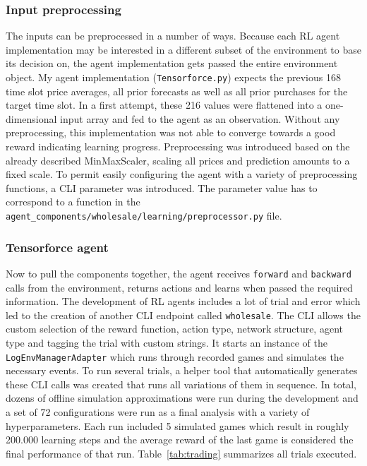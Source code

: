\subsubsection{Input preprocessing}%
\label{sub:input_preprocessing}

The inputs can be preprocessed in a number of ways. Because each \ac{RL} agent implementation may be interested in a
different subset of the environment to base its decision on, the agent implementation gets passed the entire environment
object.
My agent implementation (\texttt{Tensorforce.py})
expects the previous 168 time slot price averages, all prior forecasts as well as all prior purchases for the
target time slot. In a first attempt, these 216 values were flattened into a one-dimensional input array and fed
to the agent as an observation. Without any preprocessing, this implementation was not able to converge towards a good
reward indicating learning progress. Preprocessing was introduced based on the already described MinMaxScaler,
scaling all prices and prediction amounts to a fixed scale. To permit easily configuring the agent with a variety of
preprocessing functions, a CLI parameter was introduced. The parameter value has to correspond to a function in the
\texttt{agent\_components/wholesale/learning/preprocessor.py} file.

\subsubsection{Tensorforce agent}%
\label{sub:tensorforce_agent}

Now to pull the components together, the agent receives \texttt{forward} and \texttt{backward} calls from
the environment, returns actions and learns when passed the required information. The development of \ac{RL} agents
includes a lot of trial and error which led to the creation of another \ac{CLI} endpoint called \texttt{wholesale}. The
\ac{CLI} allows the custom selection of the reward function, action type, network structure, agent type and tagging the
trial with custom strings. It starts an instance of the \texttt{LogEnvManagerAdapter} which runs through recorded
games and simulates the necessary events. To run several trials, a helper tool that automatically generates
these CLI calls was created that runs all variations of them in sequence. In total, dozens of offline simulation approximations were
run during the development and a set of 72 configurations were run as a final analysis with a variety of
hyperparameters. Each run included 5 simulated games which result in roughly 200.000 learning steps and the average
reward of the last game is considered the final performance of that run. Table~\ref{tab:trading} summarizes all trials
executed.

